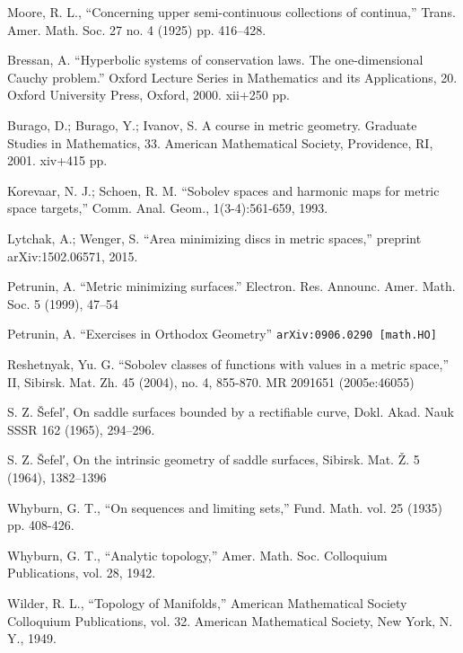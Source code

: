 \documentclass[a4paper,10pt]{amsart}
\begin{document}
\begin{thebibliography}{52}
Moore, R. L.,
``Concerning upper semi-continuous collections of continua,''
Trans. Amer. Math. Soc. 27 no. 4 (1925) pp. 416--428.

 Bressan, A.
``Hyperbolic systems of conservation laws.
The one-dimensional Cauchy problem.'' Oxford Lecture Series in Mathematics and its Applications, 20. Oxford University Press, Oxford, 2000. xii+250 pp.

Burago, D.; Burago, Y.; Ivanov, S.
A course in metric geometry.
Graduate Studies in Mathematics, 33. American Mathematical Society, Providence, RI, 2001. xiv+415 pp.

Korevaar, N. J.; Schoen, R. M. ``Sobolev spaces and harmonic maps for metric space targets,'' Comm. Anal. Geom., 1(3-4):561-659, 1993.

Lytchak, A.; Wenger, S. ``Area minimizing discs in metric spaces,'' preprint arXiv:1502.06571, 2015.

 Petrunin, A.
``Metric minimizing surfaces.''
Electron. Res. Announc. Amer. Math. Soc. 5 (1999), 47--54 

 Petrunin, A. 
``Exercises in Orthodox Geometry''
{\tt arXiv:0906.0290 [math.HO]}

Reshetnyak, Yu. G. ``Sobolev classes of functions with values in a metric space,'' II, Sibirsk. Mat. Zh. 45 (2004), no. 4, 855-870. MR 2091651 (2005e:46055)

 S. Z. \v{S}efel′, On saddle surfaces bounded by a rectifiable curve, Dokl. Akad. Nauk SSSR 162 (1965), 294--296.

 S. Z. \v{S}efel′, On the intrinsic geometry of saddle surfaces, Sibirsk. Mat. Ž. 5 (1964), 1382--1396

Whyburn, G. T., ``On sequences and limiting sets,'' Fund. Math. vol. 25 (1935) pp. 408-426.

Whyburn, G. T., ``Analytic topology,'' Amer. Math. Soc. Colloquium Publications, vol. 28, 1942.

Wilder, R. L., ``Topology of Manifolds,'' American Mathematical Society Colloquium Publications, vol. 32. American Mathematical
Society, New York, N. Y., 1949.
\end{thebibliography}
\end{document}
